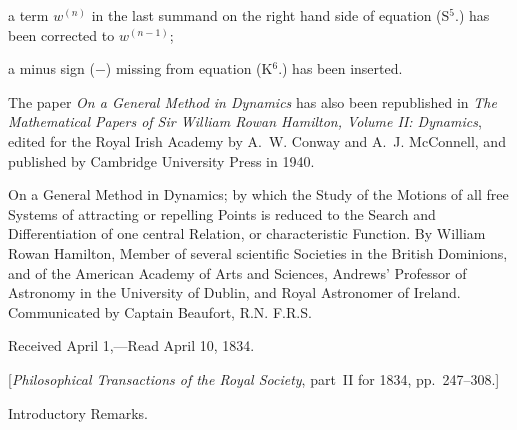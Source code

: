 \smallskip

\item{}
a term $w^{(n)}$ in the last summand on the right hand side of
equation (S${}^5$.) has been corrected to $w^{(n-1)}$;

\smallskip

\item{}
a minus sign ($-$) missing from equation (K${}^6$.) has been
inserted.

\smallskip

The paper {\it On a General Method in Dynamics} has also
been republished in {\it The Mathematical Papers of Sir
William Rowan Hamilton, Volume II: Dynamics}, edited for
the Royal Irish Academy by A.~W. Conway and A.~J. McConnell, and
published by Cambridge University Press in 1940.

\bigbreak\bigskip


\vskip3pt


\vfill\eject


\null\vskip36pt

\noindent
{\largeit
On a General Method in Dynamics; by which the Study of the
Motions of all free Systems of attracting or repelling Points is
reduced to the Search and Differentiation of one central Relation,
or characteristic Function.
By {\largesc William Rowan Hamilton}, Member of several scientific
Societies in the British Dominions, and of the American Academy
of Arts and Sciences, Andrews' Professor of Astronomy in the
University of Dublin, and Royal Astronomer of Ireland.
Communicated by Captain {\largesc Beaufort}, R.N. F.R.S.}

\vskip12pt

\centerline{Received April 1,---Read April 10, 1834.}
\vskip12pt
\centerline{[{\it Philosophical Transactions of the Royal Society},
   part~II for 1834, pp.\ 247--308.]}

\bigbreak

{\sectiontitle
Introductory Remarks.\par}

\nobreak\bigskip

